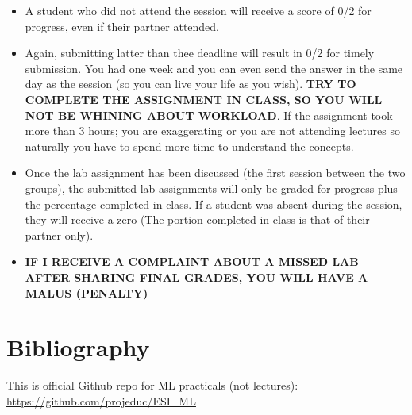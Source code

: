 \documentclass[11pt, a4paper]{article}
\begin{document}
\begin{itemize}
	\item A student who did not attend the session will receive a score of 0/2 for progress, even if their partner attended.
	\item Again, submitting latter than thee deadline will result in 0/2 for timely submission. 
	You had one week and you can even send the answer in the same day as the session (so you can live your life as you wish). 
	\textbf{\color{red}TRY TO COMPLETE THE ASSIGNMENT IN CLASS, SO YOU WILL NOT BE WHINING ABOUT WORKLOAD}. 
	If the assignment took more than 3 hours; you are exaggerating or you are not attending lectures so naturally you have to spend more time to understand the concepts. 
	\item Once the lab assignment has been discussed (the first session between the two groups), the submitted lab assignments will only be graded for progress plus the percentage completed in class.
	If a student was absent during the session, they will receive a zero (The portion completed in class is that of their partner only).
	\item \textbf{\color{red}IF I RECEIVE A COMPLAINT ABOUT A MISSED LAB AFTER SHARING FINAL GRADES, YOU WILL HAVE A MALUS (PENALTY)}
\end{itemize}

\section{Bibliography}

This is official Github repo for ML practicals (not lectures): \url{https://github.com/projeduc/ESI_ML}

\nocite{*}




\end{document}

